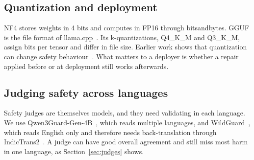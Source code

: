 \documentclass[runningheads]{llncs}
\begin{document}
\subsection{Quantization and deployment}
NF4 stores weights in 4 bits and computes in FP16 through bitsandbytes. GGUF is the file format of llama.cpp~\cite{llamacpp}. Its k-quantizations, Q4\_K\_M and Q3\_K\_M, assign bits per tensor and differ in file size. Earlier work shows that quantization can change safety behaviour~\cite{qresafe,kharinaev2026quantization,egashira2025mindthegap}. What matters to a deployer is whether a repair applied before or at deployment still works afterwards.

\subsection{Judging safety across languages}
Safety judges are themselves models, and they need validating in each language. We use Qwen3Guard-Gen-4B~\cite{qwen3guard}, which reads multiple languages, and WildGuard~\cite{wildguard}, which reads English only and therefore needs back-translation through IndicTrans2~\cite{indictrans2}. A judge can have good overall agreement and still miss most harm in one language, as Section~\ref{sec:judges} shows.
\end{document}
